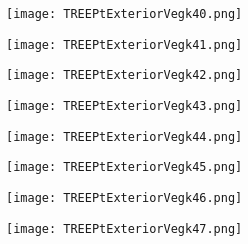 \documentclass[pdf]{beamer}
\begin{document}
\begin{frame}
\begin{figure}[!h]
\centering
\texttt{[image: TREEPtExteriorVegk40.png]}
\end{figure}
\end{frame}

\begin{frame}
\begin{figure}[!h]
\centering
\texttt{[image: TREEPtExteriorVegk41.png]}
\end{figure}
\end{frame}

\begin{frame}
\begin{figure}[!h]
\centering
\texttt{[image: TREEPtExteriorVegk42.png]}
\end{figure}
\end{frame}

\begin{frame}
\begin{figure}[!h]
\centering
\texttt{[image: TREEPtExteriorVegk43.png]}
\end{figure}
\end{frame}

\begin{frame}
\begin{figure}[!h]
\centering
\texttt{[image: TREEPtExteriorVegk44.png]}
\end{figure}
\end{frame}

\begin{frame}
\begin{figure}[!h]
\centering
\texttt{[image: TREEPtExteriorVegk45.png]}
\end{figure}
\end{frame}

\begin{frame}
\begin{figure}[!h]
\centering
\texttt{[image: TREEPtExteriorVegk46.png]}
\end{figure}
\end{frame}

\begin{frame}
\begin{figure}[!h]
\centering
\texttt{[image: TREEPtExteriorVegk47.png]}
\end{figure}
\end{frame}
\end{document}

